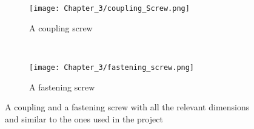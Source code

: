 \begin{figure}[h]
\begin{center}
 \begin{subfigure}{0.5\textwidth}
 \hspace{-12mm}
  \texttt{[image: Chapter\_3/coupling\_Screw.png]}
  \caption{A coupling screw} 
  \label{fig:cscrew}
 \end{subfigure} \\
 \end{center}
 \begin{center}
 \begin{subfigure}{0.5\textwidth}
  \texttt{[image: Chapter\_3/fastening\_screw.png]}
  \caption{A fastening screw}
  \label{fig:fscrew}
 \end{subfigure} 
\end{center}

 \caption{A coupling and a fastening screw with all the relevant dimensions and similar to the ones used in the project}
 \label{fig:cfscrews}
\end{figure}
